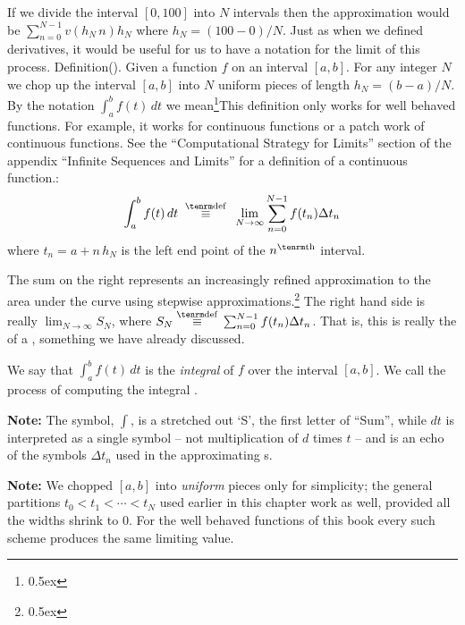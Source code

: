 If we divide the interval $[0,100]$ into $N$ intervals then  the approximation would be
$\sum_{n=0}^{N-1} v(h_N \,n) h_N$ where $h_N = (100-0)/N$.
Just as when we defined derivatives, it would be useful for us
to have a notation for the limit of this process.
\goodbreak
\proclaim Definition(). Given a function $f$ on an interval
$[a,b]$. For any integer $N$ we chop up the interval $[a,b]$ into $N$ uniform pieces of length $h_N = (b-a)/N$.
By the notation $\int_{a}^{b} f(t) \, dt$ we 
mean\footnote{\kern 0.5pt \raise 0.5ex \hbox{\dag}}{{\rm This definition only 
works for well behaved functions. For example, it works for 
continuous functions or a patch 
work of continuous functions. See the ``Computational Strategy for Limits'' section of the appendix 
``Infinite Sequences and Limits''  for a definition of a continuous function.}}:
$$
\int_{a}^{b} f(t) \, dt \;\; {\buildrel {\rm def} \over \equiv} \;\; 
\lim_{N \rightarrow \infty} \sum_{n=0}^{N-1} f(t_n) \Delta t_n
$$
where $t_n = a + n\, h_N$ is the left end point of the $n^{\rm th}$ interval.

The sum on the right represents an increasingly refined approximation to the area under the curve using
stepwise approximations.\footnote{\kern 0.5pt \raise 0.5ex \hbox{\ddag}}%
{The right hand side is really 
$\lim_{N \rightarrow \infty} S_N$, where $S_N \; {\buildrel {\rm def} \over \equiv} \; \sum_{n=0}^{N-1} f(t_n) \Delta t_n$.
That is, this is really the  of a , something we have already discussed.}


We say that $\int_{a}^{b} f(t) \, dt$ is the {\it integral\/} of $f$ over 
the interval $[a,b]$. We call the process of computing the 
integral {\it {}\/}.

{\bf Note:\/} The symbol, $\int$, is a stretched out `S', the first letter
of ``Sum'', while $dt$ is interpreted as a single symbol -- not multiplication of $d$ times $t$ --
and is an echo of the symbols $\Delta t_n$ used in the approximating s.

{\bf Note:\/} We chopped $[a,b]$ into {\it uniform\/} pieces only for
simplicity; the general partitions $t_0 < t_1 < \cdots < t_N$ used earlier in
this chapter work as well, provided all the widths shrink to $0$. For the
well behaved functions of this book every such scheme produces the same
limiting value.


